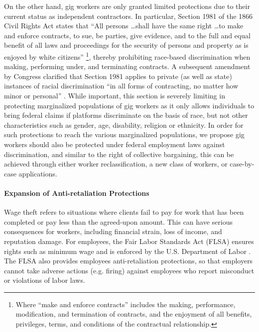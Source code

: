 On the other hand, gig workers are only granted limited protections due to their current status as independent contractors. In particular, Section 1981 of the 1866 Civil Rights Act states that ``All persons \dots shall have the same right \dots to make and enforce contracts, to sue, be parties, give evidence, and to the full and equal benefit of all laws and proceedings for the security of persons and property as is enjoyed by white citizens'' \footnote{Where ``make and enforce contracts'' includes the making, performance, modification, and termination of contracts, and the enjoyment of all benefits, privileges, terms, and conditions of the contractual relationship.}, thereby prohibiting race-based discrimination when making, performing under, and terminating contracts. A subsequent amendment by Congress clarified that Section 1981 applies to private (as well as state) instances of racial discrimination ``in all forms of contracting, no matter how minor or personal'' \cite{Leong2016-eb}. While important, this section is severely limiting in protecting marginalized populations of gig workers as it only allows individuals to bring federal claims if platforms discriminate on the basis of race, but not other characteristics such as gender, age, disability, religion or ethnicity. In order for such protections to reach the various marginalized populations, we propose gig workers should also be protected under federal employment laws against discrimination, and similar to the right of collective bargaining, this can be achieved through either worker reclassification, a new class of workers, or case-by-case applications.

\paragraph{Expansion of Anti-retaliation Protections}
Wage theft refers to situations where clients fail to pay for work that has been completed or pay less than the agreed-upon amount. This can have serious consequences for workers, including financial strain, loss of income, and reputation damage. For employees, the Fair Labor Standards Act (FLSA) ensures rights such as minimum wage and is enforced by the U.S. Department of Labor \cite{flsa}. The FLSA also provides employees anti-retaliation protections, so that employers cannot take adverse actions (e.g. firing) against employees who report misconduct or violations of labor laws. 

